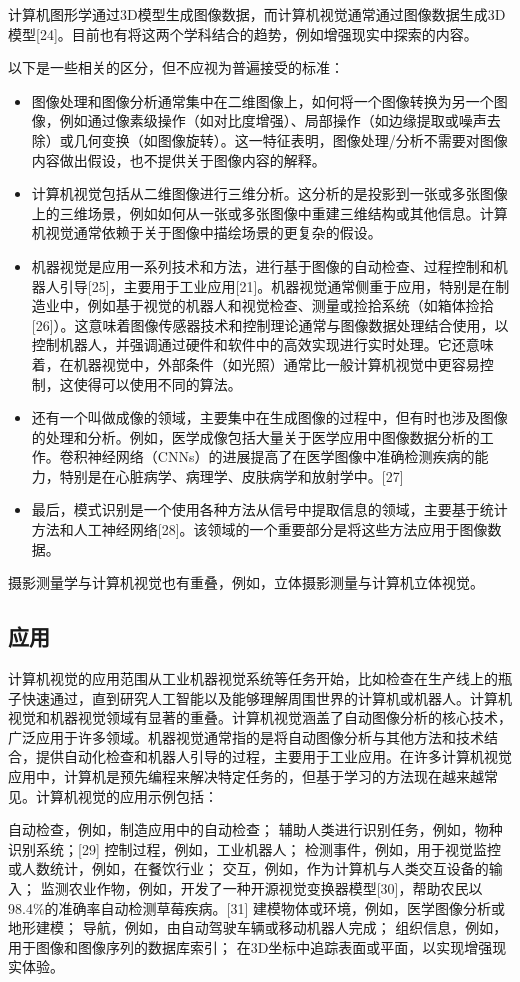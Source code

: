 计算机图形学通过3D模型生成图像数据，而计算机视觉通常通过图像数据生成3D模型[24]。目前也有将这两个学科结合的趋势，例如增强现实中探索的内容。

以下是一些相关的区分，但不应视为普遍接受的标准：
\begin{itemize}
\item 图像处理和图像分析通常集中在二维图像上，如何将一个图像转换为另一个图像，例如通过像素级操作（如对比度增强）、局部操作（如边缘提取或噪声去除）或几何变换（如图像旋转）。这一特征表明，图像处理/分析不需要对图像内容做出假设，也不提供关于图像内容的解释。 
\item 计算机视觉包括从二维图像进行三维分析。这分析的是投影到一张或多张图像上的三维场景，例如如何从一张或多张图像中重建三维结构或其他信息。计算机视觉通常依赖于关于图像中描绘场景的更复杂的假设。
\item 机器视觉是应用一系列技术和方法，进行基于图像的自动检查、过程控制和机器人引导[25]，主要用于工业应用[21]。机器视觉通常侧重于应用，特别是在制造业中，例如基于视觉的机器人和视觉检查、测量或捡拾系统（如箱体捡拾[26]）。这意味着图像传感器技术和控制理论通常与图像数据处理结合使用，以控制机器人，并强调通过硬件和软件中的高效实现进行实时处理。它还意味着，在机器视觉中，外部条件（如光照）通常比一般计算机视觉中更容易控制，这使得可以使用不同的算法。
\item 还有一个叫做成像的领域，主要集中在生成图像的过程中，但有时也涉及图像的处理和分析。例如，医学成像包括大量关于医学应用中图像数据分析的工作。卷积神经网络（CNNs）的进展提高了在医学图像中准确检测疾病的能力，特别是在心脏病学、病理学、皮肤病学和放射学中。[27]
\item 最后，模式识别是一个使用各种方法从信号中提取信息的领域，主要基于统计方法和人工神经网络[28]。该领域的一个重要部分是将这些方法应用于图像数据。
\end{itemize}
摄影测量学与计算机视觉也有重叠，例如，立体摄影测量与计算机立体视觉。
\subsection{应用}  
计算机视觉的应用范围从工业机器视觉系统等任务开始，比如检查在生产线上的瓶子快速通过，直到研究人工智能以及能够理解周围世界的计算机或机器人。计算机视觉和机器视觉领域有显著的重叠。计算机视觉涵盖了自动图像分析的核心技术，广泛应用于许多领域。机器视觉通常指的是将自动图像分析与其他方法和技术结合，提供自动化检查和机器人引导的过程，主要用于工业应用。在许多计算机视觉应用中，计算机是预先编程来解决特定任务的，但基于学习的方法现在越来越常见。计算机视觉的应用示例包括：

自动检查，例如，制造应用中的自动检查；  
辅助人类进行识别任务，例如，物种识别系统；[29]  
控制过程，例如，工业机器人；  
检测事件，例如，用于视觉监控或人数统计，例如，在餐饮行业；  
交互，例如，作为计算机与人类交互设备的输入；  
监测农业作物，例如，开发了一种开源视觉变换器模型[30]，帮助农民以98.4\%的准确率自动检测草莓疾病。[31]  
建模物体或环境，例如，医学图像分析或地形建模；  
导航，例如，由自动驾驶车辆或移动机器人完成；  
组织信息，例如，用于图像和图像序列的数据库索引；  
在3D坐标中追踪表面或平面，以实现增强现实体验。
